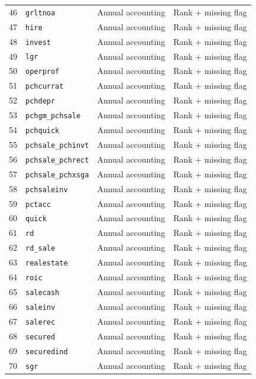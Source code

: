{\begin{longtable}{@{}rlll@{}}
46 & \texttt{grltnoa} & Annual accounting & Rank + missing flag\\
47 & \texttt{hire} & Annual accounting & Rank + missing flag\\
48 & \texttt{invest} & Annual accounting & Rank + missing flag\\
49 & \texttt{lgr} & Annual accounting & Rank + missing flag\\
50 & \texttt{operprof} & Annual accounting & Rank + missing flag\\
51 & \texttt{pchcurrat} & Annual accounting & Rank + missing flag\\
52 & \texttt{pchdepr} & Annual accounting & Rank + missing flag\\
53 & \texttt{pchgm\_pchsale} & Annual accounting & Rank + missing flag\\
54 & \texttt{pchquick} & Annual accounting & Rank + missing flag\\
55 & \texttt{pchsale\_pchinvt} & Annual accounting & Rank + missing flag\\
56 & \texttt{pchsale\_pchrect} & Annual accounting & Rank + missing flag\\
57 & \texttt{pchsale\_pchxsga} & Annual accounting & Rank + missing flag\\
58 & \texttt{pchsaleinv} & Annual accounting & Rank + missing flag\\
59 & \texttt{pctacc} & Annual accounting & Rank + missing flag\\
60 & \texttt{quick} & Annual accounting & Rank + missing flag\\
61 & \texttt{rd} & Annual accounting & Rank + missing flag\\
62 & \texttt{rd\_sale} & Annual accounting & Rank + missing flag\\
63 & \texttt{realestate} & Annual accounting & Rank + missing flag\\
64 & \texttt{roic} & Annual accounting & Rank + missing flag\\
65 & \texttt{salecash} & Annual accounting & Rank + missing flag\\
66 & \texttt{saleinv} & Annual accounting & Rank + missing flag\\
67 & \texttt{salerec} & Annual accounting & Rank + missing flag\\
68 & \texttt{secured} & Annual accounting & Rank + missing flag\\
69 & \texttt{securedind} & Annual accounting & Rank + missing flag\\
70 & \texttt{sgr} & Annual accounting & Rank + missing flag\\

\end{longtable}}
